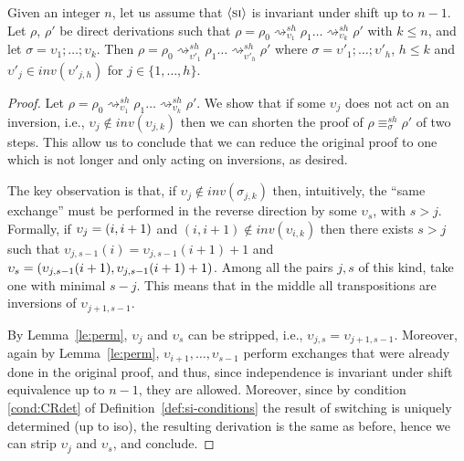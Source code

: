 \documentclass{llncs}
\newcommand{\inv}[1]{\ensuremath{inv}({#1})}
\newcommand{\shiftdir}[1][]{\ensuremath{\mathrel{{\rightsquigarrow}^{\mathit{sh}}_{#1}}}}
\newcommand{\shifteq}[1][]{\ensuremath{\mathrel{{\equiv}^\mathit{sh}_{#1}}}}
\begin{document}
\begin{lemma}
  \label{le:no-useless-shifts-bounded}
  Given an integer $n$, let us assume that $\mathrel{\langle \mbox{\textsc{si}}\rangle}$ is invariant under shift up to $n-1$.  Let $\rho$, $\rho'$ be direct derivations such that  $\rho = \rho_0 \shiftdir[\upsilon_1] \rho_1 \ldots \shiftdir[\upsilon_k] \rho'$ with $k \leq n$, and 
  let $\sigma = \upsilon_1; \ldots; \upsilon_k$.
   Then
  $\rho = \rho_0 \shiftdir[\upsilon'_1] \rho_1 \ldots \shiftdir[\upsilon'_h ]
  \rho'$ where $\sigma = \upsilon'_1; \ldots; \upsilon'_h$, $h \leq k$ and $\upsilon'_j \in \inv{\upsilon'_{j,h}}$ for $j \in \{1, \ldots,h\}$. 
\end{lemma}

\begin{proof}
  Let 
  $\rho = \rho_0 \shiftdir[\upsilon_1] \rho_1 \ldots \shiftdir[\upsilon_k ]
  \rho'$.
  We show that if some $\upsilon_j$ does not act on an inversion, i.e.,
  $\upsilon_j \not\in \inv{\upsilon_{j,k}}$ then we can shorten the
  proof of $\rho \shifteq[\sigma] \rho'$ of two steps. This 
  allow us to conclude that we can reduce the original proof to one which is not longer and only acting
  on inversions, as desired.

  The key observation is that, if
  $\upsilon_j \not\in \inv{\sigma_{j,k}}$ then, intuitively, the ``same
  exchange'' must be performed in the reverse direction by some
  $\upsilon_s$, with $s>j$.  Formally, if $\upsilon_j = \transp{i}$ and
  $(i,i+1)\not\in\inv{\upsilon_{i,k}}$ then there exists $s>j$ such that
  $\upsilon_{j,s-1}(i) = \upsilon_{j,s-1}(i+1)+1$ and
  $\upsilon_s = \transp{\upsilon_{j,s-1}(i+1)}$. Among all the pairs
  $j, s$ of this kind, take one with minimal $s-j$. This means that in
  the middle all transpositions are inversions of $\upsilon_{j+1,s-1}$.

  By Lemma~\ref{le:perm}, $\upsilon_j$ and $\upsilon_s$ can be
  stripped, i.e., $\upsilon_{j,s} = \upsilon_{j+1,s-1}$. Moreover,
  again by Lemma~\ref{le:perm},
  $\upsilon_{i+1}, \ldots, \upsilon_{s-1}$ perform exchanges that were
  already done in the original proof, and thus, since independence is
  invariant under shift equivalence up to $n-1$, they are allowed. 
  Moreover, since by condition \ref{cond:CRdet} of Definition~\ref{def:si-conditions} the result of switching is uniquely
  determined (up to iso), the resulting derivation is the same as
  before, hence we can strip $\upsilon_{j}$ and $\upsilon_{s}$,
  and conclude.
\end{proof}  
\end{document}
